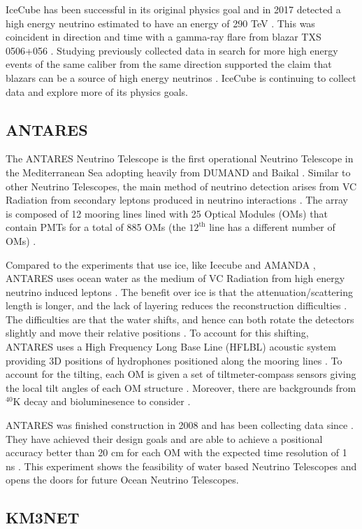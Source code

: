 IceCube has been successful in its original physics goal \cite{icecube} and in 2017 detected a high energy neutrino estimated to have an energy of 290 TeV \cite{icecube_nat}. This was coincident in direction and time with a gamma-ray flare from blazar TXS 0506+056 \cite{icecube_nat}. Studying previously collected data in search for more high energy events of the same caliber from the same direction supported the claim that blazars can be a source of high energy neutrinos \cite{icecube_nat}. IceCube is continuing to collect data and explore more of its physics goals.

\subsection{ANTARES}

The ANTARES Neutrino Telescope is the first operational Neutrino Telescope in the Mediterranean Sea \cite{antares} adopting heavily from DUMAND \cite{dumand} and Baikal \cite{baikal}. Similar to other Neutrino Telescopes, the main method of neutrino detection arises from VC Radiation from secondary leptons produced in neutrino interactions \cite{antares}. The array is composed of 12 mooring lines lined with 25 Optical Modules (OMs) that contain PMTs for a total of 885 OMs (the $12^{\text{th}}$ line has a different number of OMs) \cite{antares}.

Compared to the experiments that use ice, like Icecube \cite{icecube, icecube_nat, icecube_rad} and AMANDA \cite{amanda}, ANTARES uses ocean water as the medium of VC Radiation from high energy neutrino induced leptons \cite{antares}. The benefit over ice is that the attenuation/scattering length is longer, and the lack of layering reduces the reconstruction difficulties \cite{antares, icecube_rad}. The difficulties are that the water shifts, and hence can both rotate the detectors slightly and move their relative positions \cite{antares, icecube_rad}. To account for this shifting, ANTARES uses a High Frequency Long Base Line (HFLBL) acoustic system providing 3D positions of hydrophones positioned along the mooring lines \cite{antares}. To account for the tilting, each OM is given a set of tiltmeter-compass sensors giving the local tilt angles of each OM structure \cite{antares}. Moreover, there are backgrounds from $^{40}$K decay and bioluminesence to consider \cite{icecube_rad}.

ANTARES was finished construction in 2008 and has been collecting data since \cite{antares}. They have achieved their design goals and are able to achieve a positional accuracy better than 20 cm for each OM with the expected time resolution of 1 ns \cite{antares}. This experiment shows the feasibility of water based Neutrino Telescopes and opens the doors for future Ocean Neutrino Telescopes. 

\subsection{KM3NET}
